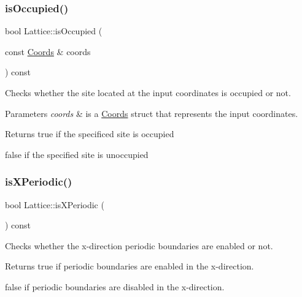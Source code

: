 \subsubsection{\texorpdfstring{is\+Occupied()}{isOccupied()}}
{\footnotesize\ttfamily bool Lattice\+::is\+Occupied (\begin{DoxyParamCaption}\item[{const \hyperlink{struct_coords}{Coords} \&}]{coords }\end{DoxyParamCaption}) const}



Checks whether the site located at the input coordinates is occupied or not. 


\begin{DoxyParams}{Parameters}
{\em coords} & is a \hyperlink{struct_coords}{Coords} struct that represents the input coordinates. \\
\hline
\end{DoxyParams}
\begin{DoxyReturn}{Returns}
true if the specificed site is occupied 

false if the specified site is unoccupied 
\end{DoxyReturn}
\mbox{\label{class_lattice_accf3b995e0d0cb422907728a29b1b523}} 
\subsubsection{\texorpdfstring{is\+X\+Periodic()}{isXPeriodic()}}
{\footnotesize\ttfamily bool Lattice\+::is\+X\+Periodic (\begin{DoxyParamCaption}{ }\end{DoxyParamCaption}) const}



Checks whether the x-\/direction periodic boundaries are enabled or not. 

\begin{DoxyReturn}{Returns}
true if periodic boundaries are enabled in the x-\/direction. 

false if periodic boundaries are disabled in the x-\/direction. 
\end{DoxyReturn}
\mbox{\label{class_lattice_ac3192acefb019c5258143a6c758b3e48}} 
